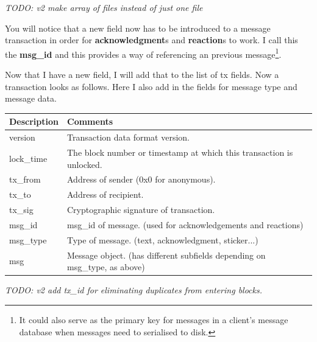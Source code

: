 \documentclass{article}
\begin{document}
\textit{TODO: v2 make array of files instead of just one file}

You will notice that a new field now has to be introduced to a message transaction in order for \textbf{acknowledgment}s and \textbf{reaction}s to work. I call this the \textbf{msg\_id} and this provides a way of referencing an previous message\footnote{It could also serve as the primary key for messages in a client's message database when messages need to serialised to disk.}.

Now that I have a new field, I will add that to the list of tx fields. Now a transaction looks as follows. Here I also add in the fields for message type and message data.
\begin{table}[H]
\centering
\begin{tabular}{|p{2.5cm}|p{8.5cm}|}
\hline
\rowcolor{tblgrey}
Description & Comments              \\ \hline
version     & Transaction data format version.                              \\ \hline
lock\_time  & The block number or timestamp at which this transaction is unlocked. \\ \hline
tx\_from    & Address of sender (0x0 for anonymous).                        \\ \hline
tx\_to      & Address of recipient.                                         \\ \hline
tx\_sig     & Cryptographic signature of transaction.                       \\ \hline
msg\_id     & msg\_id of message. (used for acknowledgements and reactions) \\ \hline
msg\_type    & Type of message. (text, acknowledgment, sticker...)          \\ \hline
msg         & Message object. (has different subfields depending on msg\_type, as above) \\ \hline
\end{tabular}
\end{table}

\textit{TODO: v2 add tx\_id for eliminating duplicates from entering blocks.}

\newpage
\label{para:bf}
\end{document}
